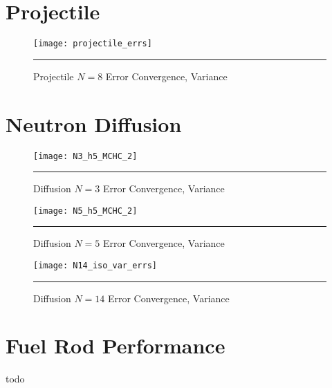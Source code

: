\section{Projectile}

\begin{figure}[H]
  \centering
    \texttt{[image: projectile\_errs]}
    \rule{35em}{0.5pt}
  \caption{Projectile $N=8$ Error Convergence, Variance}
  \label{fig:proj_varconv}
\end{figure}



\section{Neutron Diffusion}

\begin{figure}[H]
  \centering
    \texttt{[image: N3\_h5\_MCHC\_2]}
    \rule{35em}{0.5pt}
  \caption{Diffusion $N=3$ Error Convergence, Variance}
  \label{fig:diff3_varconv}
\end{figure}
\begin{figure}[H]
  \centering
    \texttt{[image: N5\_h5\_MCHC\_2]}
    \rule{35em}{0.5pt}
  \caption{Diffusion $N=5$ Error Convergence, Variance}
  \label{fig:diff5_varconv}
\end{figure}
\begin{figure}[H]
  \centering
    \texttt{[image: N14\_iso\_var\_errs]}
    \rule{35em}{0.5pt}
  \caption{Diffusion $N=14$ Error Convergence, Variance}
  \label{fig:diff14_varconv}
\end{figure}





\section{Fuel Rod Performance}
todo

